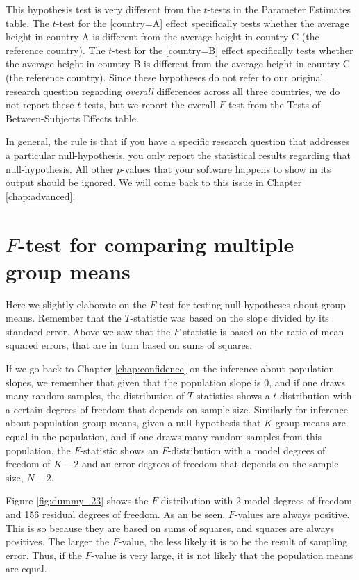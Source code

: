 \documentclass[]{report}\usepackage[]{graphicx}\usepackage[]{color}
\begin{document}
This hypothesis test is very different from the $t$-tests in the Parameter Estimates table. The $t$-test for the [country=A] effect specifically tests whether the average height in country A is different from the average height in country C (the reference country). The $t$-test for the [country=B] effect specifically tests whether the average height in country B is different from the average height in country C (the reference country). Since these hypotheses do not refer to our original research question regarding \textit{overall} differences across all three countries, we do not report these $t$-tests, but we report the overall $F$-test from the Tests of Between-Subjects Effects table.

In general, the rule is that if you have a specific research question that addresses a particular null-hypothesis, you only report the statistical results regarding that null-hypothesis. All other $p$-values that your software happens to show in its output should be ignored. We will come back to this issue in Chapter \ref{chap:advanced}.






\section{$F$-test for comparing multiple group means}

Here we slightly elaborate on the $F$-test for testing null-hypotheses about group means. Remember that the $T$-statistic was based on the slope divided by its standard error. Above we saw that the $F$-statistic is based on the ratio of mean squared errors, that are in turn based on sums of squares. 

If we go back to Chapter \ref{chap:confidence} on the inference about population slopes, we remember that given that the population slope is 0, and if one draws many random samples, the distribution of $T$-statistics shows a $t$-distribution with a certain degrees of freedom that depends on sample size. Similarly for inference about population group means, given a null-hypothesis that $K$ group means are equal in the population, and if one draws many random samples from this population, the $F$-statistic shows an $F$-distribution with a model degrees of freedom of $K-2$ and an error degrees of freedom that depends on the sample size, $N-2$.

Figure \ref{fig:dummy_23} shows the $F$-distribution with 2 model degrees of freedom and 156 residual degrees of freedom. As an be seen, $F$-values are always positive. This is so because they are based on sums of squares, and squares are always positives. The larger the $F$-value, the less likely it is to be the result of sampling error. Thus, if the $F$-value is very large, it is not likely that the population means are equal. 
\end{document}
